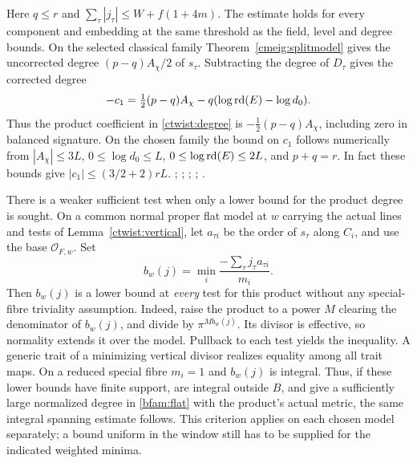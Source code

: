 Here \(q\le r\) and \(\sum_\tau|j_\tau|\le W+f(1+4m)\).
The estimate holds for every component and embedding at the same
threshold as the field, level and degree bounds. On the selected
classical family Theorem~\ref{cmeig:splitmodel} gives the
uncorrected degree \((p-q)A_\chi/2\) of \(s_\tau\). Subtracting
the degree of \(D_\tau\) gives the corrected degree
\[
        -c_1=\tfrac12(p-q)A_\chi-q(\log{\rm rd}(E)-\log d_0).
\]
Thus the product coefficient in \eqref{ctwist:degree} is
\(-\tfrac12(p-q)A_\chi\), including zero in balanced signature.
On the chosen family
the bound on \(c_1\) follows numerically from
\(|A_\chi|\le3L\), \(0\le\log d_0\le L\),
\(0\le\log{\rm rd}(E)\le2L\), and \(p+q=r\).
In fact these bounds give \( |c_1|\le(3/2+2)rL\).
;
;
;
;
.

There is a weaker sufficient test when only a lower bound for the
product degree is sought. On a common normal proper flat model at
\(w\) carrying the actual lines and tests of Lemma~\ref{ctwist:vertical},
let \(a_{\tau i}\) be the order of \(s_\tau\) along \(C_i\), and use
the base \(\mathcal O_{F,w}\). Set
\[
 b_w(j)=\min_i\frac{-\sum_\tau j_\tau a_{\tau i}}{m_i}.
\]
Then \(b_w(j)\) is a lower bound at \emph{every} test for this
product without any special-fibre triviality assumption. Indeed,
raise the product to a power \(M\) clearing the denominator of
\(b_w(j)\), and divide by \(\pi^{Mb_w(j)}\). Its divisor is
effective, so normality extends it over the model. Pullback to
each test yields the inequality. A generic trait of a minimizing
vertical divisor realizes equality among all trait maps. On a
reduced special fibre \(m_i=1\) and \(b_w(j)\) is integral.
Thus, if these lower bounds have finite support, are integral
outside \(B\), and give a sufficiently large normalized degree
in \eqref{bfam:flat} with the product's actual metric, the same
integral spanning estimate follows. This criterion applies on each
chosen model separately; a bound uniform in the window still has
to be supplied for the indicated weighted minima.


